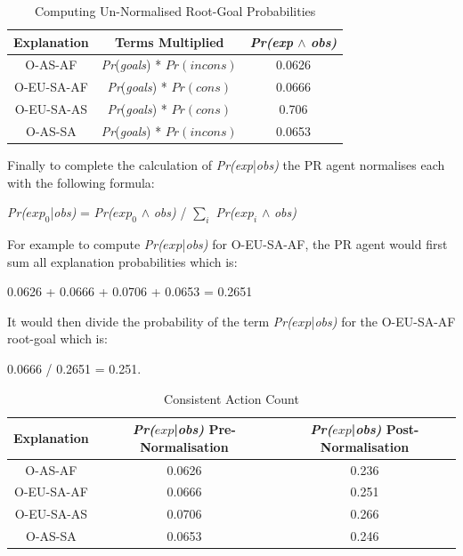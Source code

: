 \documentclass[parskip]{cs4rep}
\begin{document}
\begin{table}[ht]
\centering
\begin{tabular}{|c|c|c|}
\hline 
\textbf{Explanation} & \textbf{Terms Multiplied} &\textit{Pr(exp} $\wedge$ \textit{obs)} \\ 
\hline 
O-AS-AF & \textit{Pr}(\textit{goals}) * $Pr(incons)$ & 0.0626 \\ 
\hline 
O-EU-SA-AF & \textit{Pr}(\textit{goals}) * $Pr(cons)$ & 0.0666 \\ 
\hline 
O-EU-SA-AS & \textit{Pr}(\textit{goals}) * $Pr(cons)$ & 0.706 \\ 
\hline 
O-AS-SA & \textit{Pr}(\textit{goals}) * $Pr(incons)$ & 0.0653 \\ 
\hline 
\end{tabular}
\caption{Computing Un-Normalised Root-Goal Probabilities}
\label{table:territory-actions-bonus}
\end{table}

\newpage

Finally to complete the calculation of \textit{Pr(exp}|\textit{obs)} the PR agent normalises each with the following formula: \newline

\centerline{
\textit{Pr($exp_0$}|\textit{obs)} = \textit{Pr($exp_0$} $\wedge$ \textit{obs)} / $\displaystyle\sum\nolimits_{i}$ \textit{Pr($exp_i$} $\wedge$ \textit{obs)}
}

For example to compute \textit{Pr($exp$}|\textit{obs)} for O-EU-SA-AF, the PR agent would first sum all explanation probabilities which is:

0.0626 + 0.0666 + 0.0706 + 0.0653 = 0.2651 

It would then divide the probability of the term \textit{Pr($exp$}|\textit{obs)} for the O-EU-SA-AF root-goal which is:

0.0666 / 0.2651 = 0.251.

\begin{table}[ht]
\centering
\begin{tabular}{|c|c|c|}
\hline 
\textbf{Explanation} &  \textit{Pr($exp$}|\textit{obs)} Pre-Normalisation &  \textit{Pr($exp$}|\textit{obs)} Post-Normalisation \\ 
\hline 
O-AS-AF & 0.0626 & 0.236  \\ 
\hline 
O-EU-SA-AF &  0.0666 & 0.251 \\
\hline 
O-EU-SA-AS &  0.0706 & 0.266 \\ 
\hline 
O-AS-SA & 0.0653 & 0.246 \\ 
\hline 
\end{tabular}
\caption{Consistent Action Count}
\label{table:territory-actions-bonus}
\end{table}
\end{document}
